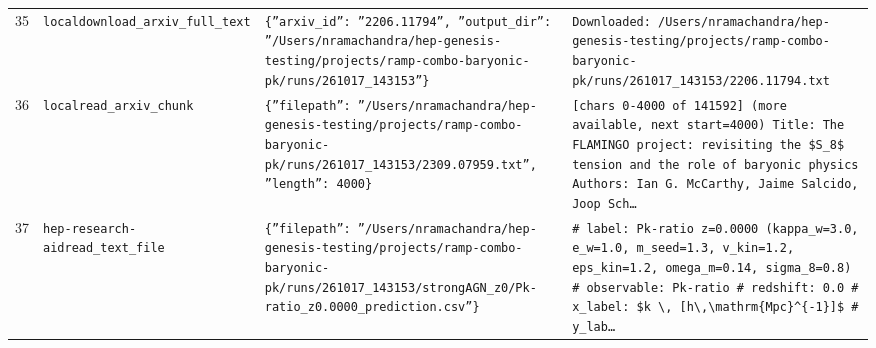 \documentclass[11pt,a4paper]{article}
\begin{document}
\begin{longtable}{@{}p{}p{}p{}p{}@{}}
35 & \texttt{local}\newline\texttt{download\_\allowbreak{}arxiv\_\allowbreak{}full\_\allowbreak{}text} & \texttt{\{''arxiv\_\allowbreak{}id'':\allowbreak{} ''2206.11794'',\allowbreak{} ''output\_\allowbreak{}dir'':\allowbreak{} ''/\allowbreak{}Users/\allowbreak{}nramachandra/\allowbreak{}hep-genesis-testing/\allowbreak{}projects/\allowbreak{}ramp-combo-baryonic-pk/\allowbreak{}runs/\allowbreak{}261017\_\allowbreak{}143153''\}\allowbreak{}} & \texttt{Downloaded:\allowbreak{} /\allowbreak{}Users/\allowbreak{}nramachandra/\allowbreak{}hep-genesis-testing/\allowbreak{}projects/\allowbreak{}ramp-combo-baryonic-pk/\allowbreak{}runs/\allowbreak{}261017\_\allowbreak{}143153/\allowbreak{}2206.11794.txt} \\
36 & \texttt{local}\newline\texttt{read\_\allowbreak{}arxiv\_\allowbreak{}chunk} & \texttt{\{''filepath'':\allowbreak{} ''/\allowbreak{}Users/\allowbreak{}nramachandra/\allowbreak{}hep-genesis-testing/\allowbreak{}projects/\allowbreak{}ramp-combo-baryonic-pk/\allowbreak{}runs/\allowbreak{}261017\_\allowbreak{}143153/\allowbreak{}2309.07959.txt'',\allowbreak{} ''length'':\allowbreak{} 4000\}\allowbreak{}} & \texttt{[chars 0-4000 of 141592]\allowbreak{} (more available,\allowbreak{} next start=\allowbreak{}4000)\allowbreak{}  Title:\allowbreak{} The FLAMINGO project:\allowbreak{} revisiting the \$S\_\allowbreak{}8\$ tension and the role of baryonic physics Authors:\allowbreak{} Ian G. McCarthy,\allowbreak{} Jaime Salcido,\allowbreak{} Joop Sch\ldots{}\allowbreak{}} \\
37 & \texttt{hep-research-aid}\newline\texttt{read\_\allowbreak{}text\_\allowbreak{}file} & \texttt{\{''filepath'':\allowbreak{} ''/\allowbreak{}Users/\allowbreak{}nramachandra/\allowbreak{}hep-genesis-testing/\allowbreak{}projects/\allowbreak{}ramp-combo-baryonic-pk/\allowbreak{}runs/\allowbreak{}261017\_\allowbreak{}143153/\allowbreak{}strongAGN\_\allowbreak{}z0/\allowbreak{}Pk-ratio\_\allowbreak{}z0.0000\_\allowbreak{}prediction.csv''\}\allowbreak{}} & \texttt{\# label:\allowbreak{} Pk-ratio z=\allowbreak{}0.0000 (kappa\_\allowbreak{}w=\allowbreak{}3.0,\allowbreak{} e\_\allowbreak{}w=\allowbreak{}1.0,\allowbreak{} m\_\allowbreak{}seed=\allowbreak{}1.3,\allowbreak{} v\_\allowbreak{}kin=\allowbreak{}1.2,\allowbreak{} eps\_\allowbreak{}kin=\allowbreak{}1.2,\allowbreak{} omega\_\allowbreak{}m=\allowbreak{}0.14,\allowbreak{} sigma\_\allowbreak{}8=\allowbreak{}0.8)\allowbreak{} \# observable:\allowbreak{} Pk-ratio \# redshift:\allowbreak{} 0.0 \# x\_\allowbreak{}label:\allowbreak{} \$k \textbackslash{}\allowbreak{},\allowbreak{} [h\textbackslash{}\allowbreak{},\allowbreak{}\textbackslash{}\allowbreak{}mathrm\{Mpc\}\allowbreak{}\textasciicircum{}\allowbreak{}\{-1\}\allowbreak{}]\allowbreak{}\$ \# y\_\allowbreak{}lab\ldots{}\allowbreak{}} \\

\end{longtable}
\end{document}
